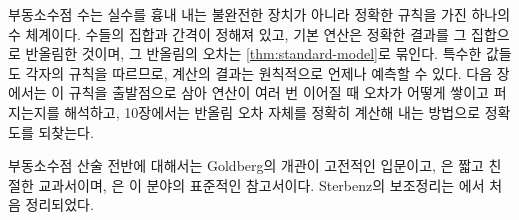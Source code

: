 부동소수점 수는 실수를 흉내 내는 불완전한 장치가 아니라 정확한 규칙을 가진 하나의 수 체계이다. 수들의 집합과 간격이 정해져 있고, 기본 연산은 정확한 결과를 그 집합으로 반올림한 것이며, 그 반올림의 오차는 \cref{thm:standard-model}로 묶인다. 특수한 값들도 각자의 규칙을 따르므로, 계산의 결과는 원칙적으로 언제나 예측할 수 있다. 다음 장에서는 이 규칙을 출발점으로 삼아 연산이 여러 번 이어질 때 오차가 어떻게 쌓이고 퍼지는지를 해석하고, 10장에서는 반올림 오차 자체를 정확히 계산해 내는 방법으로 정확도를 되찾는다.

부동소수점 산술 전반에 대해서는 Goldberg의 개관\cite{goldberg1991}이 고전적인 입문이고, \cite{overton2001}은 짧고 친절한 교과서이며, \cite{muller2018handbook}은 이 분야의 표준적인 참고서이다. Sterbenz의 보조정리는 \cite{sterbenz1974}에서 처음 정리되었다.

\chapterreferences
